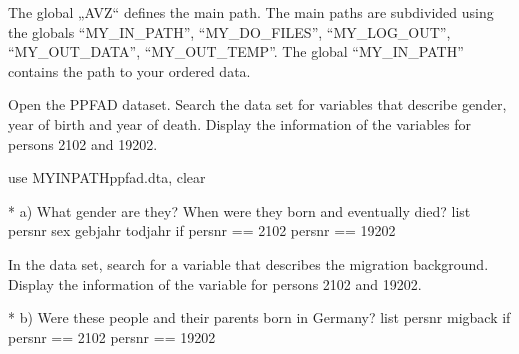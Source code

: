 \documentclass[letterpaper,10pt,openany,onesideH,english]{sphinxmanual}
\begin{document}
The global „AVZ“ defines the main path. The main paths are subdivided using the globals “MY\_IN\_PATH”, “MY\_DO\_FILES”, “MY\_LOG\_OUT”, “MY\_OUT\_DATA”, “MY\_OUT\_TEMP”. The global “MY\_IN\_PATH” contains the path to your ordered data.




Open the PPFAD dataset. Search the data set for variables that describe gender, year of birth and year of death. Display the information of the variables for persons 2102 and 19202.

%
\begin{sphinxVerbatim}[commandchars=\\\{\},numbers=left,firstnumber=1,stepnumber=1]
use \PYGZdq{}\PYGZdl{}\PYGZob{}MY\PYGZus{}IN\PYGZus{}PATH\PYGZcb{}ppfad.dta\PYGZdq{}, clear

* a) What gender are they? When were they born and eventually died?
list persnr sex gebjahr todjahr if persnr == 2102 \textbar{} persnr == 19202
\end{sphinxVerbatim}

\begin{figure}[H]
\centering

\noindent{}
\end{figure}


In the data set, search for a variable that describes the migration background.
Display the information of the variable for persons 2102 and 19202.

%
\begin{sphinxVerbatim}[commandchars=\\\{\},numbers=left,firstnumber=1,stepnumber=1]
* b) Were these people and their parents born in Germany?
list persnr migback if persnr == 2102 \textbar{} persnr == 19202
\end{sphinxVerbatim}

\begin{figure}[H]
\centering

\noindent{}
\end{figure}
\end{document}
